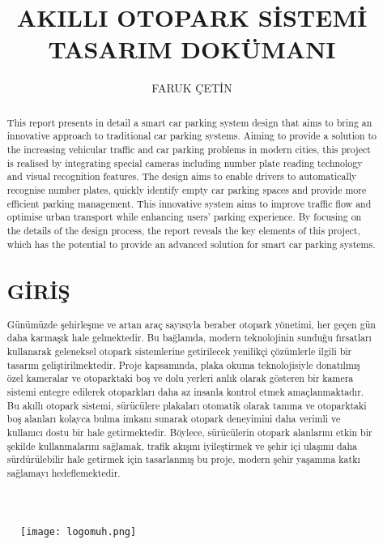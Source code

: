 \documentclass[12pt, a4paper]{article}
\title{AKILLI OTOPARK SİSTEMİ TASARIM DOKÜMANI}
\author{FARUK ÇETİN}
\begin{document}
	\begin{figure}[!ht]
		\centering
		\texttt{[image: logomuh.png]}
		\maketitle
	\end{figure}
	\justify
	\frenchspacing
	\begin{abstract}
		This report presents in detail a smart car parking system design that aims to bring an innovative approach to traditional car parking systems. Aiming to provide a solution to the increasing vehicular traffic and car parking problems in modern cities, this project is realised by integrating special cameras including number plate reading technology and visual recognition features. The design aims to enable drivers to automatically recognise number plates, quickly identify empty car parking spaces and provide more efficient parking management. This innovative system aims to improve traffic flow and optimise urban transport while enhancing users' parking experience. By focusing on the details of the design process, the report reveals the key elements of this project, which has the potential to provide an advanced solution for smart car parking systems.
		
		\newpage
		\tableofcontents{} \newpage
		\section{GİRİŞ}
		Günümüzde şehirleşme ve artan araç sayısıyla beraber otopark yönetimi, her geçen gün daha karmaşık hale gelmektedir. Bu bağlamda, modern teknolojinin sunduğu fırsatları kullanarak geleneksel otopark sistemlerine getirilecek yenilikçi çözümlerle ilgili bir tasarım geliştirilmektedir. Proje kapsamında, plaka okuma teknolojisiyle donatılmış özel kameralar ve otoparktaki boş ve dolu yerleri anlık olarak gösteren bir kamera sistemi entegre edilerek otoparkları daha az insanla kontrol etmek  amaçlan\-maktadır. Bu akıllı otopark sistemi, sürücülere plakaları otomatik olarak tanıma ve otoparktaki boş alanları kolayca bulma imkanı sunarak otopark deneyimini daha verimli ve kullanıcı dostu bir hale getirmektedir. Böylece, sürücülerin otopark alanlarını etkin bir şekilde kullanmalarını sağlamak, trafik akışını iyileştirmek ve şehir içi ulaşımı daha sürdürülebilir hale getirmek için tasarlanmış bu proje, modern şehir yaşamına katkı sağlamayı hedeflemektedir.

\end{abstract}
\end{document}
